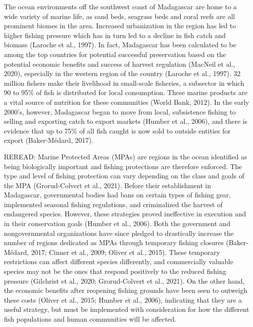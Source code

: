 \documentclass[
]{article}
\begin{document}
The ocean environments off the southwest coast of Madagascar are home to a wide variety of marine life, as sand beds, seagrass beds and coral reefs are all prominent biomes in the area. Increased urbanization in the region has led to higher fishing pressure which has in turn led to a decline in fish catch and biomass (Laroche et al., 1997). In fact, Madagascar has been calculated to be among the top countries for potential successful preservation based on the potential economic benefits and success of harvest regulation (MacNeil et al., 2020), especially in the western region of the country (Laroche et al., 1997). 32 million fishers make their livelihood in small-scale fisheries, a subsector in which 90 to 95\% of fish is distributed for local consumption. These marine products are a vital source of nutrition for these communities (World Bank, 2012). In the early 2000's, however, Madagascar began to move from local, subsistence fishing to selling and exporting catch to export markets (Humber et al., 2006), and there is evidence that up to 75\% of all fish caught is now sold to outside entities for export (Baker-Médard, 2017).

REREAD:
Marine Protected Areas (MPAs) are regions in the ocean identified as being biologically important and fishing protections are therefore enforced. The type and level of fishing protection can vary depending on the class and goals of the MPA (Grorud-Colvert et al., 2021). Before their establishment in Madagascar, governmental bodies had bans on certain types of fishing gear, implemented seasonal fishing regulations, and criminalized the harvest of endangered species. However, these strategies proved ineffective in execution and in their conservation goals (Humber et al., 2006). Both the government and nongovernmental organizations have since pledged to drastically increase the number of regions dedicated as MPAs through temporary fishing closures (Baker-Médard, 2017; Cinner et al., 2009; Oliver et al., 2015). These temporary restrictions can affect different species differently, and commercially valuable species may not be the ones that respond positively to the reduced fishing pressure (Gilchrist et al., 2020; Grorud-Colvert et al., 2021). On the other hand, the economic benefits after reopening fishing grounds have been seen to outweigh these costs (Oliver et al., 2015; Humber et al., 2006), indicating that they are a useful strategy, but must be implemented with consideration for how the different fish populations and human communities will be affected.
\end{document}
